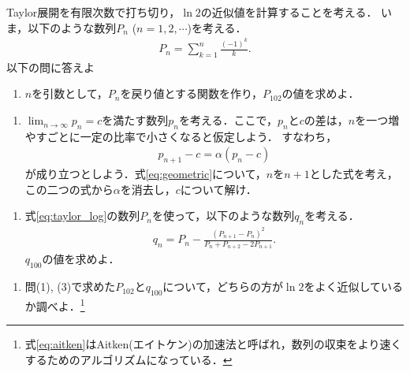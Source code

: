 \documentclass[a4paper,12pt]{jsarticle}
\begin{document}
Taylor展開を有限次数で打ち切り，$\ln 2$の近似値を計算することを考える．
いま，以下のような数列$P_{n}$ ($n=1,2,\cdots$)を考える．
\begin{align}
\label{eq:taylor_log}
    P_{n}=\sum_{k=1}^{n}\frac{(-1)^k}{k}.
\end{align}
以下の問に答えよ

\begin{enumerate}
    \item[(1)] $n$を引数として，$P_{n}$を戻り値とする関数を作り，$P_{102}$の値を求めよ．
\end{enumerate}
\begin{enumerate}
    \item[(2)] $\lim_{n\to\infty}p_n=c$を満たす数列$p_{n}$を考える．ここで，$p_n$と$c$の差は，$n$を一つ増やすごとに一定の比率で小さくなると仮定しよう．
    すなわち，
    \begin{align}
    \label{eq:geometric}
        p_{n+1}-c=\alpha(p_{n}-c)
    \end{align}
    が成り立つとしよう．式\eqref{eq:geometric}について，$n$を$n+1$とした式を考え，この二つの式から$\alpha$を消去し，$c$について解け．
\end{enumerate}
\begin{enumerate}
    \item[(3)] 
    式\eqref{eq:taylor_log}の数列$P_{n}$を使って，以下のような数列$q_{n}$を考える．
    \begin{align}
    \label{eq:aitken}
        q_{n}=P_{n}-\frac{(P_{n+1}-P_{n})^{2}}{P_{n}+P_{n+2}-2P_{n+1}}.
    \end{align}
    $q_{100}$の値を求めよ．
\end{enumerate}
\begin{enumerate}
    \item[(4)] 問(1), (3)で求めた$P_{102}$と$q_{100}$について，どちらの方が$\ln2$をよく近似しているか調べよ．\footnote{
    式\eqref{eq:aitken}はAitken(エイトケン)の加速法と呼ばれ，数列の収束をより速くするためのアルゴリズムになっている．
    }
\end{enumerate}

%
%
\end{document}
